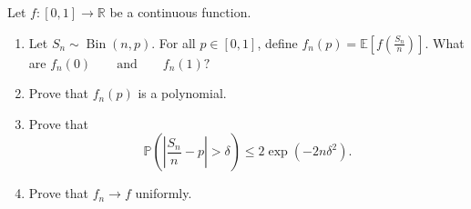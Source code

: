\begin{quiz}

Let $f:[0,1]\to\mathbb{R}$ be a continuous function.

\begin{enumerate}

    \item Let
    \(
    S_n\sim\operatorname{Bin}(n,p).
    \)
    For all $p\in[0,1]$, define
    \(
    f_n(p)
    =
    \mathbb{E}\left[
        f\left(\frac{S_n}{n}\right)
    \right].
    \)
    What are
    \(
    f_n(0)
    \qquad\text{and}\qquad
    f_n(1)?
    \)

    \item Prove that $f_n(p)$ is a polynomial.

    \item Prove that
    \[
    \mathbb{P}\left(
        \left|\frac{S_n}{n}-p\right|>\delta
    \right)
    \leq
    2\exp\left(-2n\delta^2\right).
    \]

    \item Prove that
    \(
    f_n\longrightarrow f
    \)
    uniformly.

\end{enumerate}

\end{quiz}


